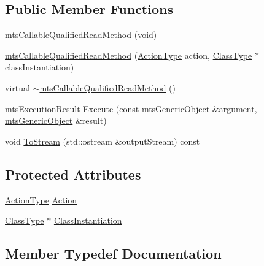 \subsection*{Public Member Functions}
\begin{DoxyCompactItemize}
\item 
\hyperlink{classmts_callable_qualified_read_method_a098279bdc51bf3652822ab8e21061fb0}{mts\+Callable\+Qualified\+Read\+Method} (void)
\item 
\hyperlink{classmts_callable_qualified_read_method_a5e7503b7d68e7d603174b693a4c97616}{mts\+Callable\+Qualified\+Read\+Method} (\hyperlink{classmts_callable_qualified_read_method_a6327de6d1017295be394178d8e03b121}{Action\+Type} action, \hyperlink{classmts_callable_qualified_read_method_a6cfee5c3c3c49c691c2f5176ea79d735}{Class\+Type} $\ast$class\+Instantiation)
\item 
virtual \hyperlink{classmts_callable_qualified_read_method_a6dde782b8c89d361aab0110b80befbbb}{$\sim$mts\+Callable\+Qualified\+Read\+Method} ()
\item 
mts\+Execution\+Result \hyperlink{classmts_callable_qualified_read_method_a834b39e11c3048d401ebbff94123f729}{Execute} (const \hyperlink{classmts_generic_object}{mts\+Generic\+Object} \&argument, \hyperlink{classmts_generic_object}{mts\+Generic\+Object} \&result)
\item 
void \hyperlink{classmts_callable_qualified_read_method_a279196a1b216f18f168c98a17dc89901}{To\+Stream} (std\+::ostream \&output\+Stream) const 
\end{DoxyCompactItemize}
\subsection*{Protected Attributes}
\begin{DoxyCompactItemize}
\item 
\hyperlink{classmts_callable_qualified_read_method_a6327de6d1017295be394178d8e03b121}{Action\+Type} \hyperlink{classmts_callable_qualified_read_method_a50eaa90d9c1fb7ffa80933c21869c1b8}{Action}
\item 
\hyperlink{classmts_callable_qualified_read_method_a6cfee5c3c3c49c691c2f5176ea79d735}{Class\+Type} $\ast$ \hyperlink{classmts_callable_qualified_read_method_ae3b6667da77471acabf410afa3a541d1}{Class\+Instantiation}
\end{DoxyCompactItemize}


\subsection{Member Typedef Documentation}
\hypertarget{classmts_callable_qualified_read_method_a6327de6d1017295be394178d8e03b121}{}
